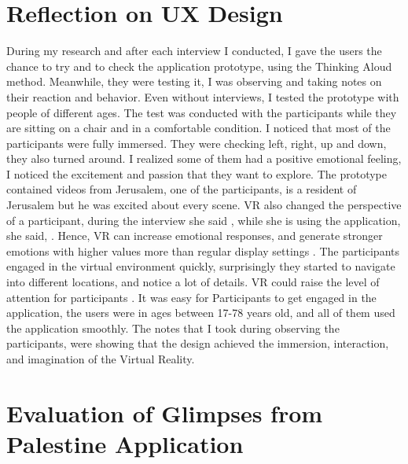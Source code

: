 \section{Reflection on UX Design}

During my research and after each interview I conducted, I gave the users the chance to try and to check the application prototype, using the Thinking Aloud method. Meanwhile, they were testing it, I was observing and taking notes on their reaction and behavior. Even without interviews, I tested the prototype with people of different ages. The test was conducted with the participants while they are sitting on a chair and in a comfortable condition. 
I noticed that most of the participants were fully immersed. They were checking left, right, up and down, they also turned around. I realized some of them had a positive emotional feeling, I noticed the excitement and passion that they want to explore. The prototype contained videos from Jerusalem, one of the participants, is a resident of Jerusalem but he was excited about every scene. VR also changed the perspective of a participant, during the interview she said , while she is using the application, she said, . Hence, VR can increase emotional responses, and generate stronger emotions with higher values more than regular display settings \citep{Estupinan2014CanStudy}. The participants engaged in the virtual environment quickly, surprisingly they started to navigate into different locations, and notice a lot of details. VR could raise the level of attention for participants \citep{Estupinan2014CanStudy}. It was easy for Participants to get engaged in the application, the users were in ages between 17-78 years old, and all of them used the application smoothly. The notes that I took during observing the participants, were showing that the design achieved the immersion, interaction, and imagination of the Virtual Reality. 
 

\section{Evaluation of Glimpses from Palestine Application}

